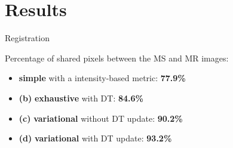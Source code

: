\documentclass[10pt]{beamer}
\begin{document}
  


\section{Results}

\begin{frame}{Registration}

  \vspace{-0.3cm}
  Percentage of shared pixels between the MS and MR images:
  \begin{itemize}
  \item \textbf{simple} with a intensity-based metric: \textbf{77.9\%}
  \item \textbf{(b)} \textbf{exhaustive} with DT: \textbf{84.6\%}
  \item \textbf{(c)} \textbf{variational} without DT update: \textbf{90.2\%}
  \item \textbf{(d)} \textbf{variational} with DT update: \textbf{93.2\%}
  \end{itemize}


\end{frame}
\end{document}
